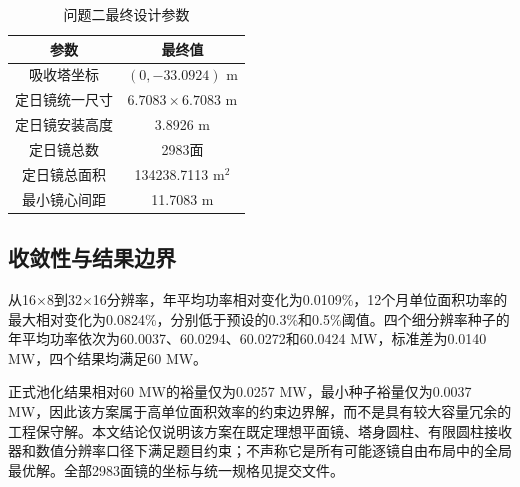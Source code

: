 \begin{table}[htbp]
  \centering
  \caption{问题二最终设计参数}
  \label{tab:q2-design}
  \small
  \begin{tabular}{cc}
    \toprule
    参数 & 最终值 \\
    \midrule
    吸收塔坐标 & $(0,-33.0924)$ m \\
    定日镜统一尺寸 & $6.7083\times6.7083$ m \\
    定日镜安装高度 & 3.8926 m \\
    定日镜总数 & 2983面 \\
    定日镜总面积 & 134238.7113 m$^2$ \\
    最小镜心间距 & 11.7083 m \\
    \bottomrule
  \end{tabular}
\end{table}

\subsection{收敛性与结果边界}

从16×8到32×16分辨率，年平均功率相对变化为0.0109\%，12个月单位面积功率的最大相对变化为0.0824\%，分别低于预设的0.3\%和0.5\%阈值。四个细分辨率种子的年平均功率依次为60.0037、60.0294、60.0272和60.0424 MW，标准差为0.0140 MW，四个结果均满足60 MW。

正式池化结果相对60 MW的裕量仅为0.0257 MW，最小种子裕量仅为0.0037 MW，因此该方案属于高单位面积效率的约束边界解，而不是具有较大容量冗余的工程保守解。本文结论仅说明该方案在既定理想平面镜、塔身圆柱、有限圆柱接收器和数值分辨率口径下满足题目约束；不声称它是所有可能逐镜自由布局中的全局最优解。全部2983面镜的坐标与统一规格见提交文件。
